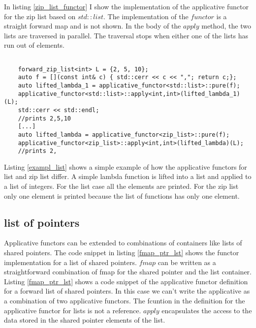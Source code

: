 \documentclass[12pt,fleqn]{article}
\begin{document}
In listing \ref{zip_list_functor} I show the implementation of the applicative functor for the zip list based on $std::list$. 
The implementation of the $functor$ is  a straight forward map and is not shown. 
In the body of the $apply$ method, the two lists are traversed in parallel. The traversal stops when either one of the lists has run out of elements.
\begin{lstlisting}[caption=the applicative functor for list and ziplist, label=exampl_list]

	forward_zip_list<int> L = {2, 5, 10};
	auto f = [](const int& c) { std::cerr << c << ","; return c;};
	auto lifted_lambda_1 = applicative_functor<std::list>::pure(f);
	applicative_functor<std::list>::apply<int,int>(lifted_lambda_1)(L);
	std::cerr << std::endl;
    //prints 2,5,10
    [...]
	auto lifted_lambda = applicative_functor<zip_list>::pure(f);
	applicative_functor<zip_list>::apply<int,int>(lifted_lambda)(L);
    //prints 2,
\end{lstlisting}

Listing \ref{exampl_list} shows a simple example of how the applicative functors for list and zip list differ. 
A simple lambda function is lifted into a list and applied to a list of integers. 
For the list case all the elements are printed. For the zip list only one element is printed because the list of functions has only one element.
\subsection*{list of pointers}
Applicative functors can be extended to combinations of containers like lists of shared pointers.
The code snippet in listing \ref{fmap_ptr_lst} shows the functor implementation for a list of shared pointers.
$fmap$ can be written as a straightforward combination of fmap for the shared pointer and the list container.
Listing \ref{fmap_ptr_lst} shows a code snippet of the applicative functor definition for a forward list of shared pointers.
In this case we can't write the applicative as a combination of two applicative functors. 
The fcuntion in the definition for the applicative functor for lists is not a reference.
$apply$ encapsulates the access to the data stored in the shared pointer elements of the list.
\end{document}
